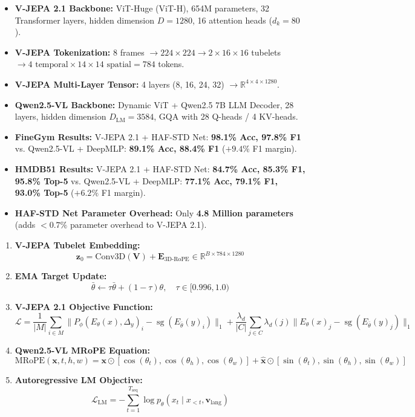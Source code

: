 \documentclass[a4paper, 11pt]{article}
\begin{document}
\begin{cheatsheetbox}
\begin{itemize}
    \item \textbf{V-JEPA 2.1 Backbone:} ViT-Huge (ViT-H), 654M parameters, 32 Transformer layers, hidden dimension $D = 1280$, 16 attention heads ($d_k = 80$).
    \item \textbf{V-JEPA Tokenization:} 8 frames $\rightarrow 224 \times 224 \rightarrow 2 \times 16 \times 16$ tubelets $\rightarrow 4 \text{ temporal} \times 14 \times 14 \text{ spatial} = 784$ tokens.
    \item \textbf{V-JEPA Multi-Layer Tensor:} 4 layers (8, 16, 24, 32) $\rightarrow \mathbb{R}^{4 \times 4 \times 1280}$.
    \item \textbf{Qwen2.5-VL Backbone:} Dynamic ViT + Qwen2.5 7B LLM Decoder, 28 layers, hidden dimension $D_{\text{LM}} = 3584$, GQA with 28 Q-heads / 4 KV-heads.
    \item \textbf{FineGym Results:} V-JEPA 2.1 + HAF-STD Net: \textbf{98.1\% Acc, 97.8\% F1} vs. Qwen2.5-VL + DeepMLP: \textbf{89.1\% Acc, 88.4\% F1} ($\mathbf{+9.4\%}$ F1 margin).
    \item \textbf{HMDB51 Results:} V-JEPA 2.1 + HAF-STD Net: \textbf{84.7\% Acc, 85.3\% F1, 95.8\% Top-5} vs. Qwen2.5-VL + DeepMLP: \textbf{77.1\% Acc, 79.1\% F1, 93.0\% Top-5} ($\mathbf{+6.2\%}$ F1 margin).
    \item \textbf{HAF-STD Net Parameter Overhead:} Only \textbf{4.8 Million parameters} (adds $<0.7\%$ parameter overhead to V-JEPA 2.1).
\end{itemize}
\end{cheatsheetbox}

\vspace{0.3cm}

\begin{cheatsheetbox}
\begin{enumerate}
    \item \textbf{V-JEPA Tubelet Embedding:}
    $$\mathbf{z}_0 = \text{Conv3D}(\mathbf{V}) + \mathbf{E}_{\text{3D-RoPE}} \in \mathbb{R}^{B \times 784 \times 1280}$$
    \item \textbf{EMA Target Update:}
    $$\bar{\theta} \leftarrow \tau \bar{\theta} + (1 - \tau) \theta, \quad \tau \in [0.996, 1.0)$$
    \item \textbf{V-JEPA 2.1 Objective Function:}
    $$\mathcal{L} = \frac{1}{|M|}\sum_{i \in M} \|P_\phi(E_\theta(x), \Delta_y)_i - \operatorname{sg}(E_{\bar{\theta}}(y)_i)\|_1 + \frac{\lambda_d}{|C|}\sum_{j \in C} \lambda_d(j) \|E_\theta(x)_j - \operatorname{sg}(E_{\bar{\theta}}(y)_j)\|_1$$
    \item \textbf{Qwen2.5-VL MRoPE Equation:}
    $$\text{MRoPE}(\mathbf{x}, t, h, w) = \mathbf{x} \odot [\cos(\theta_t), \cos(\theta_h), \cos(\theta_w)] + \hat{\mathbf{x}} \odot [\sin(\theta_t), \sin(\theta_h), \sin(\theta_w)]$$
    \item \textbf{Autoregressive LM Objective:}
    $$\mathcal{L}_{\text{LM}} = -\sum_{t=1}^{T_{\text{seq}}} \log p_\theta(x_t \mid x_{<t}, \mathbf{v}_{\text{lang}})$$
\end{enumerate}
\end{cheatsheetbox}
\end{document}
